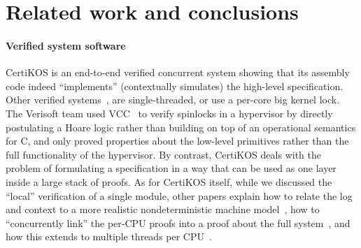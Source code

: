 \section{Related work and conclusions} 
\label{sec:related}

\paragraph{Verified system software}
CertiKOS is an end-to-end verified concurrent system showing that its
assembly code indeed ``implements'' (contextually simulates) the
high-level specification.
Other verified systems~\cite{klein2009sel4,hawblitzel10,hawblitzel:ironclad},
are single-threaded, or use a per-core big kernel lock.
The Verisoft team used VCC~\cite{vcc09} to verify spinlocks in a
hypervisor by directly postulating a Hoare logic rather than building
on top of an operational semantics for C, and only proved properties
about the low-level primitives rather than the full functionality of
the hypervisor. By contrast, CertiKOS deals with the problem of
formulating a specification in a way that can be used as one layer
inside a large stack of proofs. As for CertiKOS itself, while we
discussed the ``local'' verification of a single module, other papers
explain how to relate the log and context to a more realistic
nondeterministic machine model~\cite{certikos16}, how to
``concurrently link'' the per-CPU proofs into a proof about the full
system~\cite{ccal16}, and how this extends to multiple threads per
CPU~\cite{ccal16}.

